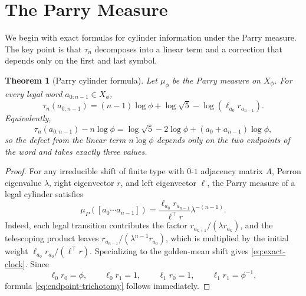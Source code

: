 \documentclass[pdflatex,sn-basic,Numbered]{sn-jnl}
\theoremstyle{thmstyleone}
\newtheorem{theorem}{Theorem}[section]
\theoremstyle{thmstyletwo}
\theoremstyle{thmstylethree}
\newcommand{\leanverified}[1]{}
\begin{document}
\section{The Parry Measure}

We begin with exact formulas for cylinder information under the Parry measure. The key point is that $\tau_n$ decomposes into a linear term and a correction that depends only on the first and last symbol.

\begin{theorem}[Parry cylinder formula]\label{thm:exact-clock}
Let $\mu_\phi$ be the Parry measure on $X_\phi$. For every legal word $a_{0:n-1}\in X_\phi$,
\begin{equation}\label{eq:exact-clock}
\tau_n(a_{0:n-1})
=
(n-1)\log\phi+\log\sqrt{5}-\log(\ell_{a_0}r_{a_{n-1}}).
\end{equation}
Equivalently,
\begin{equation}\label{eq:endpoint-trichotomy}
\tau_n(a_{0:n-1})-n\log\phi
=
\log\sqrt{5}-2\log\phi+(a_0+a_{n-1})\log\phi,
\end{equation}
so the defect from the linear term $n\log\phi$ depends only on the two endpoints of the word and takes exactly three values.
\leanverified{paper_zero_jitter_exact_clock}
\end{theorem}

\begin{proof}
For any irreducible shift of finite type with $0$-$1$ adjacency matrix $A$, Perron eigenvalue $\lambda$, right eigenvector $r$, and left eigenvector $\ell$, the Parry measure of a legal cylinder satisfies
\[
\mu_P([a_0\cdots a_{n-1}])
=
\frac{\ell_{a_0}r_{a_{n-1}}}{\ell^\top r}\lambda^{-(n-1)}.
\]
Indeed, each legal transition contributes the factor $r_{a_{k+1}}/(\lambda r_{a_k})$, and the telescoping product leaves $r_{a_{n-1}}/(\lambda^{n-1}r_{a_0})$, which is multiplied by the initial weight $\ell_{a_0}r_{a_0}/(\ell^\top r)$. Specializing to the golden-mean shift gives \eqref{eq:exact-clock}. Since
\[
\ell_0r_0=\phi,\qquad \ell_0r_1=1,\qquad \ell_1r_0=1,\qquad \ell_1r_1=\phi^{-1},
\]
formula \eqref{eq:endpoint-trichotomy} follows immediately.
\end{proof}
\end{document}
